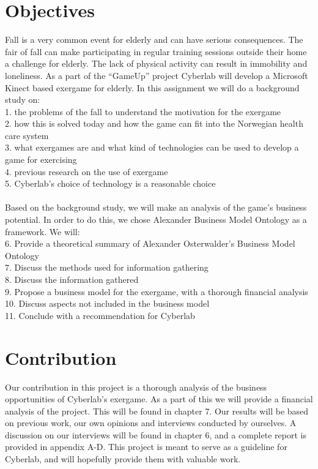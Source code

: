 \section{Objectives}
Fall is a very common event for elderly and can have serious consequences. The fair of fall can make participating in regular training sessions outside their home a challenge for elderly. The lack of physical activity can result in immobility and loneliness. As a part of the “GameUp” project Cyberlab will develop a Microsoft Kinect based exergame for elderly.  In this assignment we will do a background study on:\\
1. the problems of the fall to understand the motivation for the exergame\\
2. how this is solved today and how the game can fit into the Norwegian health care system\\
3. what exergames are and what kind of technologies can be used to develop a game for exercising\\
4. previous research on the use of exergame\\
5. Cyberlab’s choice of technology is a reasonable choice\\ \\
Based on the background study, we will make an analysis of the game’s business potential. In order to do this, we chose Alexander Business Model Ontology as a framework. We will: \\
6. Provide a theoretical summary of Alexander Osterwalder’s Business Model Ontology\\
7. Discuss the methods used for information gathering \\
8. Discuss the information gathered \\
9. Propose a business model for the exergame, with a thorough financial analysis \\
10. Discuss aspects not included in the business model \\
11. Conclude with a recommendation for Cyberlab

\section{Contribution}
Our contribution in this project is a thorough analysis of the business opportunities of Cyberlab’s exergame. As a part of this we will provide a financial analysis of the project. This will be found in chapter 7. Our results will be based on previous work, our own opinions and interviews conducted by ourselves. A discussion on our interviews will be found in chapter 6, and a complete report is provided in appendix A-D. This project is meant to serve as a guideline for Cyberlab, and will hopefully provide them with valuable work.  

